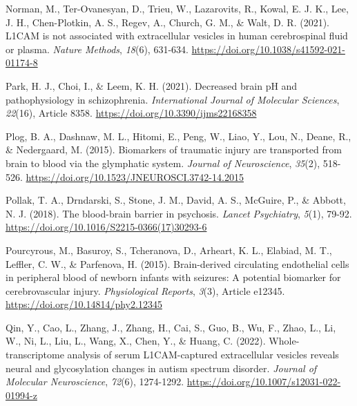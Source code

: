 \documentclass[authordate, empirical]{jote-new-article}
\begin{document}
	Norman, M., Ter-Ovanesyan, D., Trieu, W., Lazarovits, R., Kowal, E. J. K., Lee, J. H., Chen-Plotkin, A. S., Regev, A., Church, G. M., \& Walt, D. R. (2021). L1CAM is not associated with extracellular vesicles in human cerebrospinal fluid or plasma. \emph{Nature Methods},\emph{ 18}(6), 631-634. \href{https://doi.org/10.1038/s41592-021-01174-8}{https://doi.org/10.1038/s41592-021-01174-8}



	Park, H. J., Choi, I., \& Leem, K. H. (2021). Decreased brain pH and pathophysiology in schizophrenia. \emph{International Journal of Molecular Sciences},\emph{ 22}(16), Article 8358. \href{https://doi.org/10.3390/ijms22168358}{https://doi.org/10.3390/ijms22168358}



	Plog, B. A., Dashnaw, M. L., Hitomi, E., Peng, W., Liao, Y., Lou, N., Deane, R., \& Nedergaard, M. (2015). Biomarkers of traumatic injury are transported from brain to blood via the glymphatic system. \emph{Journal of Neuroscience},\emph{ 35}(2), 518-526. \href{https://doi.org/10.1523/JNEUROSCI.3742-14.2015}{https://doi.org/10.1523/JNEUROSCI.3742-14.2015}



	Pollak, T. A., Drndarski, S., Stone, J. M., David, A. S., McGuire, P., \& Abbott, N. J. (2018). The blood-brain barrier in psychosis. \emph{Lancet Psychiatry},\emph{ 5}(1), 79-92. \href{https://doi.org/10.1016/S2215-0366(17)30293-6}{https://doi.org/10.1016/S2215-0366(17)30293-6}



	Pourcyrous, M., Basuroy, S., Tcheranova, D., Arheart, K. L., Elabiad, M. T., Leffler, C. W., \& Parfenova, H. (2015). Brain-derived circulating endothelial cells in peripheral blood of newborn infants with seizures: A potential biomarker for cerebrovascular injury. \emph{Physiological Reports},\emph{ 3}(3), Article e12345. \href{https://doi.org/10.14814/phy2.12345}{https://doi.org/10.14814/phy2.12345}



	Qin, Y., Cao, L., Zhang, J., Zhang, H., Cai, S., Guo, B., Wu, F., Zhao, L., Li, W., Ni, L., Liu, L., Wang, X., Chen, Y., \& Huang, C. (2022). Whole-transcriptome analysis of serum L1CAM-captured extracellular vesicles reveals neural and glycosylation changes in autism spectrum disorder. \emph{Journal of Molecular Neuroscience},\emph{ 72}(6), 1274-1292. \href{https://doi.org/10.1007/s12031-022-01994-z}{https://doi.org/10.1007/s12031-022-01994-z}
\end{document}
